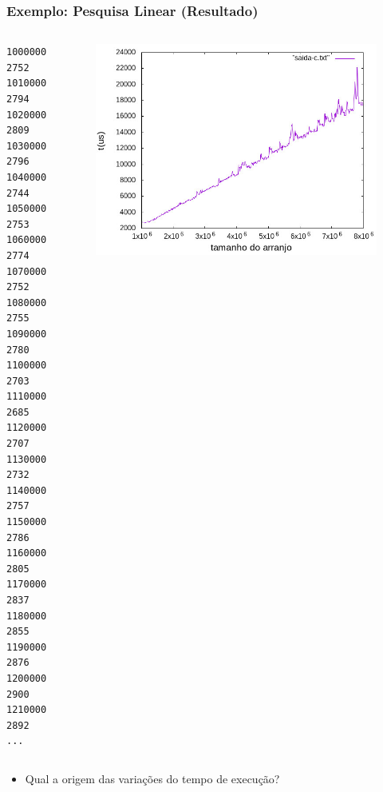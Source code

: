 \documentclass[aspectratio=169]{beamer}
\begin{document}
\begin{frame}[fragile]\frametitle{Exemplo: Pesquisa Linear (Resultado)}
\vspace{-5mm}
\begin{columns}[T]
\begin{column}{0.2\linewidth}{\tiny
\begin{verbatim}
1000000 2752
1010000 2794
1020000 2809
1030000 2796
1040000 2744
1050000 2753
1060000 2774
1070000 2752
1080000 2755
1090000 2780
1100000 2703
1110000 2685
1120000 2707
1130000 2732
1140000 2757
1150000 2786
1160000 2805
1170000 2837
1180000 2855
1190000 2876
1200000 2900
1210000 2892
...	
\end{verbatim}
}
\end{column}
\begin{column}{0.8\linewidth}
\begin{figure}[h]
	\centering
	\includegraphics[height=0.65\paperheight]{pucrs-ec-poo-unidade_01-complexidade_de_algoritmos-laminas-grafico6.jpg}
\end{figure}
\end{column}
\end{columns}
\begin{itemize}
	\item Qual a origem das variações do tempo de execução?
\end{itemize}
\end{frame}
\end{document}
